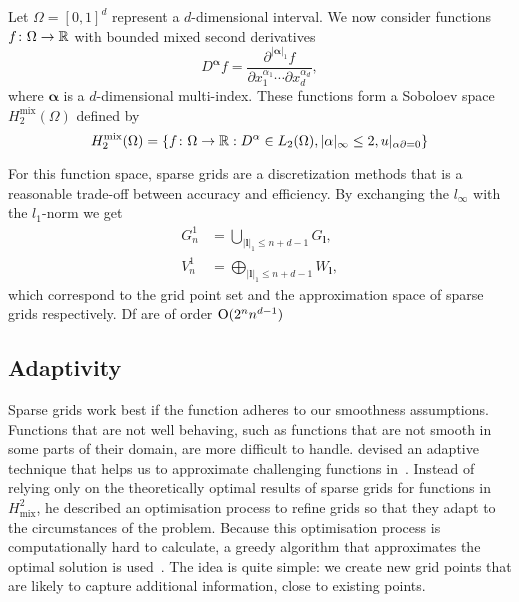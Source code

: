 Let \(\Omega = [0, 1]^d\) represent a \(d\)-dimensional interval. 
We now consider functions \(f \colon \Omega \to \mathbb{R}\) with bounded mixed second derivatives
\begin{equation*}
  D^{\bm{\alpha}} f = \frac{\partial^{\vert \bm{\alpha} \vert_1 } f}{\partial x^{\alpha_1}_1 \cdots \partial x^{\alpha_d}_d},
\end{equation*}
where \(\bm{\alpha}\) is a \(d\)-dimensional multi-index.
These functions form a Soboloev space \(H_2^\text{mix}(\Omega)\) defined by
\begin{equation*}
  H_2^\text{mix}(\Omega) = \{ f \colon \Omega \to \mathbb{R} : D^\alpha \in L_2(\Omega), \vert \alpha \vert_\infty \leq 2, u \rvert_{\alpha \partial = 0}\}
\end{equation*}

For this function space, sparse grids are a discretization methods that is a
reasonable trade-off between accuracy and efficiency.
By exchanging the \(l_\infty\) with the \(l_1\)-norm we get
\begin{align}
  G_n^1 &= \bigcup_{\vert {\bm{l}} \vert_1 \leq n + d - 1} G_{\bm{l}}, \nonumber \\
  V_n^1 &= \bigoplus_{\vert {\bm{l}} \vert_1 \leq n + d - 1} W_{\bm{l}} \label{eq:sparse-grid-space},
\end{align}
which correspond to the grid point set and the approximation space of sparse
grids respectively.
Df are of order \( \operatorname{O} (2^n n^{d-1})\)

\subsection{Adaptivity}
Sparse grids work best if the function adheres to our smoothness assumptions.
Functions that are not well behaving, such as functions that are not smooth in
some parts of their domain, are more difficult to handle.
\citeauthor{spatAdaptGrid} devised an adaptive technique that helps us to approximate challenging functions in~\cite{spatAdaptGrid}.
Instead of relying only on the theoretically optimal results of sparse grids for
functions in \(H^2_{\text{mix}}\), he described an optimisation process to
refine grids so that they adapt to the circumstances of the problem.
Because this optimisation process is computationally hard to calculate, a greedy
algorithm that approximates the optimal solution is used~\cite{spatAdaptGrid}.
The idea is quite simple: we create new grid points that are likely to capture
additional information, close to existing points.

